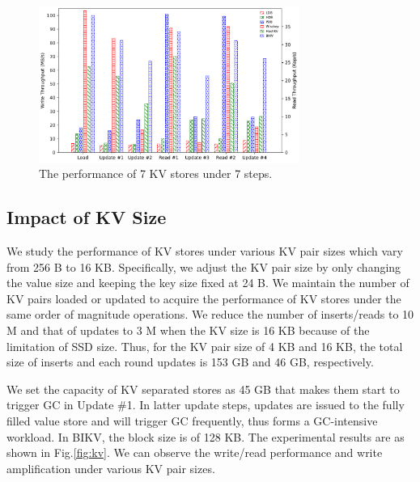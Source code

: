 \documentclass[sigconf]{acmart}
\begin{document}
\begin{figure}[!t]
	\setlength{\abovecaptionskip}{0.cm}	
	\setlength{\belowcaptionskip}{-0.cm}
	\centering
	\includegraphics[width=85mm]{total_performance.pdf}
	\caption{The performance of 7 KV stores under 7 steps.}
	\label{fig:pc}
\end{figure}

\subsection{Impact of KV Size}
We study the performance of KV stores under various KV pair sizes which vary from 256 B to 16 KB. Specifically, we adjust the KV pair size by only changing the value size and keeping the key size fixed at 24 B. We maintain the number of KV pairs loaded or updated to acquire the performance of KV stores under the same order of magnitude operations. We reduce the number of inserts/reads to 10 M and that of updates to 3 M when the KV size is 16 KB because of the limitation of SSD size. Thus, for the KV pair size of 4 KB and 16 KB, the total size of inserts and each round updates is 153 GB and 46 GB, respectively.

We set the capacity of KV separated stores as 45 GB that makes them start to trigger GC in Update \#1. In latter update steps, updates are issued to the fully filled value store and will trigger GC frequently, thus forms a GC-intensive workload. In BIKV, the block size is of 128 KB. The experimental results are as shown in Fig.\ref{fig:kv}. We can observe the write/read performance and write amplification under various KV pair sizes. 
\end{document}
